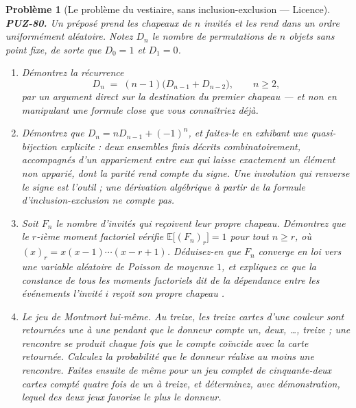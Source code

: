 \documentclass[11pt]{article}
\newtheorem{problem}{Problème}
\begin{document}
\begin{problem}[{Le problème du vestiaire, sans inclusion-exclusion --- Licence}]
\textbf{PUZ-80.} Un préposé prend les chapeaux de $ n $ invités et les rend dans un
ordre uniformément aléatoire. Notez $ D_n $ le nombre de permutations de $ n $ objets
sans point fixe, de sorte que $ D_0 = 1 $ et $ D_1 = 0 $.
\begin{enumerate}
\item[(a)] Démontrez la récurrence
\[ D_n \;=\; (n-1)\big(D_{n-1} + D_{n-2}\big), \qquad n \ge 2, \]
par un argument direct sur la destination du premier chapeau --- et non en manipulant une
formule close que vous connaîtriez déjà.
\item[(b)] Démontrez que $ D_n = n D_{n-1} + (-1)^{n} $, et faites-le en exhibant une
quasi-bijection explicite : deux ensembles finis décrits combinatoirement, accompagnés d'un
appariement entre eux qui laisse exactement un élément non apparié, dont la parité rend
compte du signe. Une involution qui renverse le signe est l'outil ; une dérivation algébrique
à partir de la formule d'inclusion-exclusion ne compte pas.
\item[(c)] Soit $ F_n $ le nombre d'invités qui reçoivent leur propre chapeau. Démontrez que le
$ r $-ième moment factoriel vérifie $ \mathbb{E}\big[(F_n)_r\big] = 1 $ pour tout
$ n \ge r $, où $ (x)_r = x(x-1)\cdots(x-r+1) $. Déduisez-en que $ F_n $ converge en
loi vers une variable aléatoire de Poisson de moyenne $ 1 $, et expliquez ce que la
constance de tous les moments factoriels dit de la dépendance entre les événements
\og{} l'invité $ i $ reçoit son propre chapeau \fg{}.
\item[(d)] Le jeu de Montmort lui-même. Au \textit{treize}, les treize cartes d'une couleur sont
retournées une à une pendant que le donneur compte \og{} un, deux, \dots{}, treize \fg{} ; une
\textit{rencontre} se produit chaque fois que le compte coïncide avec la carte retournée.
Calculez la probabilité que le donneur réalise au moins une rencontre. Faites ensuite de
même pour un jeu complet de cinquante-deux cartes compté quatre fois de un à treize, et
déterminez, avec démonstration, lequel des deux jeux favorise le plus le donneur.
\end{enumerate}

\end{problem}
\end{document}
